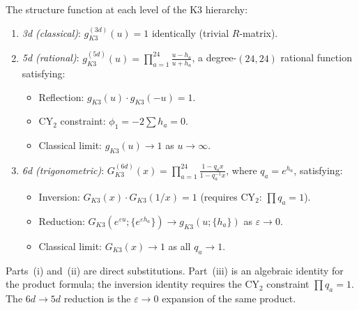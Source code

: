 \begin{proposition}
\label{prop:k3-structure-fn-hierarchy}
The structure function at each level of the K3 hierarchy:
\begin{enumerate}[label=\textup{(\roman*)}]
 \item \emph{3d (classical)}: $g_{K3}^{(3d)}(u) = 1$ identically (trivial $R$-matrix).

 \item \emph{5d (rational)}: $g_{K3}^{(5d)}(u) = \prod_{a=1}^{24} \frac{u - h_a}{u + h_a}$, a degree-$(24,24)$ rational function satisfying:
 \begin{itemize}
 \item Reflection: $g_{K3}(u) \cdot g_{K3}(-u) = 1$.
 \item CY$_2$ constraint: $\phi_1 = -2\sum h_a = 0$.
 \item Classical limit: $g_{K3}(u) \to 1$ as $u \to \infty$.
 \end{itemize}

 \item \emph{6d (trigonometric)}: $G_{K3}^{(6d)}(x) = \prod_{a=1}^{24} \frac{1 - q_a x}{1 - q_a^{-1} x}$, where $q_a = e^{h_a}$, satisfying:
 \begin{itemize}
 \item Inversion: $G_{K3}(x) \cdot G_{K3}(1/x) = 1$ (requires CY$_2$: $\prod q_a = 1$).
 \item Reduction: $G_{K3}(e^{\varepsilon u}; \{e^{\varepsilon h_a}\}) \to g_{K3}(u; \{h_a\})$ as $\varepsilon \to 0$.
 \item Classical limit: $G_{K3}(x) \to 1$ as all $q_a \to 1$.
 \end{itemize}
\end{enumerate}
Parts~(i) and~(ii) are direct substitutions. Part~(iii) is an
algebraic identity for the product formula; the inversion identity
requires the CY$_2$ constraint \(\prod q_a=1\). The \(6d\to5d\)
reduction is the \(\varepsilon\to0\) expansion of the same product.
\end{proposition}

